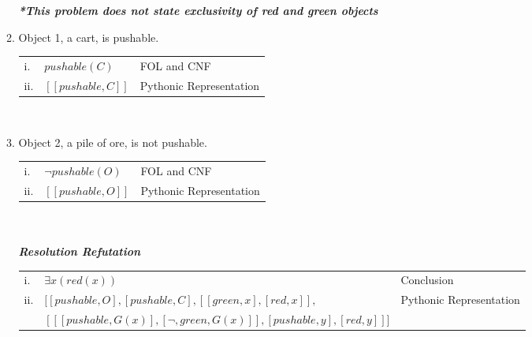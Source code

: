 \documentclass{article}
\begin{document}
\begin{enumerate}
\begin{enumerate}
\begin{tabular}{lll}
        \end{tabular}\\\\
        \textit{\textbf{*This problem does not state exclusivity of red and green objects}}
        \item Object 1, a cart, is pushable.\\
        \begin{tabular}{lll}
            i. & $pushable(C)$ & FOL and CNF\\
            ii. & $[[pushable, C]]$  & Pythonic Representation
        \end{tabular}\\

        \item Object 2, a pile of ore, is not pushable.\\
        \begin{tabular}{lll}
            i. & $\neg pushable(O)$ & FOL and CNF\\
            ii. & $[[pushable, O]]$  & Pythonic Representation
        \end{tabular}\\\\
        \textit{\textbf{Resolution Refutation}}\\
        \begin{tabular}{lll}
            i. & $\exists x(red(x))$ & Conclusion\\
            ii. & $[[pushable, O],[pushable, C],[[green,x],[red,x]],$ & Pythonic Representation\\
                & $[[[pushable, G(x)], [\neg, green, G(x)]], [pushable,y], [red,y]]]$
        \end{tabular}\\\\
    \end{enumerate}


\end{enumerate}
\end{document}
